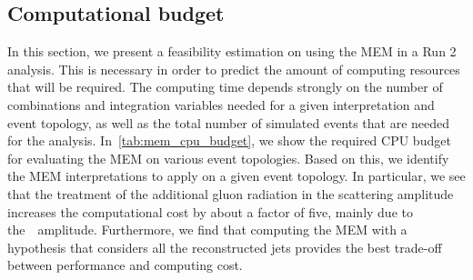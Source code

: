 \subsection{Computational budget}
\label{sec:mem_computational}
In this section, we present a feasibility estimation on using the MEM in a Run 2 analysis. This is necessary in order to predict the amount of computing resources that will be required. The computing time depends strongly on the number of combinations and integration variables needed for a given interpretation and event topology, as well as the total number of simulated events that are needed for the analysis. In~\cref{tab:mem_cpu_budget}, we show the required CPU budget for evaluating the MEM on various event topologies. Based on this, we identify the MEM interpretations to apply on a given event topology. In particular, we see that the treatment of the additional gluon radiation in the scattering amplitude increases the computational cost by about a factor of five, mainly due to the~\ttbb~amplitude. Furthermore, we find that computing the MEM with a hypothesis that considers all the reconstructed jets provides the best trade-off between performance and computing cost.

